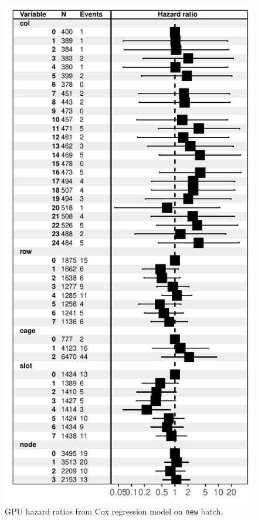 \begin{figure}
  \centering
  \includegraphics[width=0.8\columnwidth]{figs/cox_n001.pdf}
  \caption{GPU hazard ratios from Cox regression model on {\tt new}
    batch.}
  \label{fig:cox-new}
\end{figure}

